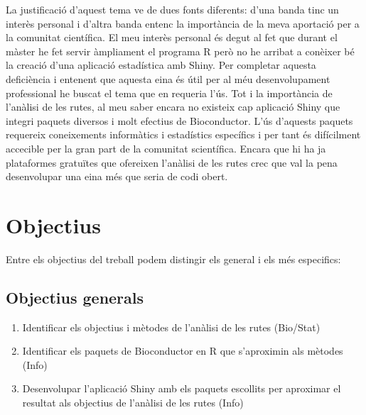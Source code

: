 \documentclass[]{article}
\begin{document}
La justificació d'aquest tema ve de dues fonts diferents: d'una banda tinc un interès personal i d'altra banda entenc la importància de la meva aportació per a la comunitat científica. El meu interès personal és degut al fet que durant el màster he fet servir àmpliament el programa R però no he arribat a conèixer bé la creació d'una aplicació estadística amb Shiny. Per completar aquesta deficiència i entenent que aquesta eina és útil per al méu desenvolupament professional he buscat el tema que en requeria l'ús. Tot i la importància de l'anàlisi de les rutes, al meu saber encara no existeix cap aplicació Shiny que integri paquets diversos i molt efectius de Bioconductor. L'ús d'aquests paquets requereix coneixements informàtics i estadístics específics i per tant és difícilment accecible per la gran part de la comunitat scientífica. Encara que hi ha ja plataformes gratuïtes que ofereixen l'anàlisi de les rutes \cite{reimand2019pathway} crec que val la pena desenvolupar una eina més que seria de codi obert.



\section{Objectius}

Entre els objectius del treball podem distingir els general i els més especifics:
 
\subsection{Objectius generals}
\begin{enumerate}
\item Identificar els objectius i mètodes de l'anàlisi de les rutes (Bio/Stat)
\item Identificar els paquets de Bioconductor en R que s'aproximin als mètodes (Info)
\item Desenvolupar l'aplicació Shiny  amb els paquets escollits per aproximar el resultat als objectius de l'anàlisi de les rutes  (Info)
\end{enumerate}
\end{document}

